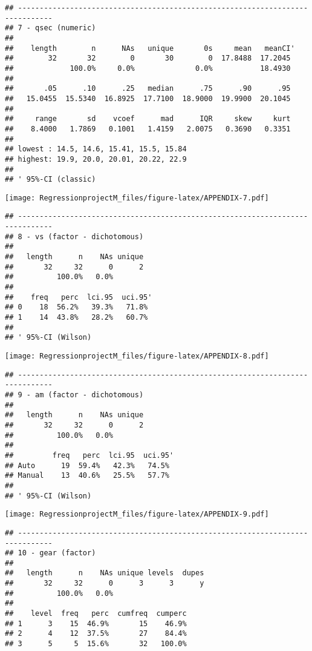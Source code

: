 \documentclass[
]{article}
\begin{document}
\begin{verbatim}
## ------------------------------------------------------------------------------ 
## 7 - qsec (numeric)
## 
##    length        n      NAs   unique       0s     mean   meanCI'
##        32       32        0       30        0  17.8488  17.2045
##             100.0%     0.0%              0.0%           18.4930
##                                                                
##       .05      .10      .25   median      .75      .90      .95
##   15.0455  15.5340  16.8925  17.7100  18.9000  19.9900  20.1045
##                                                                
##     range       sd    vcoef      mad      IQR     skew     kurt
##    8.4000   1.7869   0.1001   1.4159   2.0075   0.3690   0.3351
##                                                                
## lowest : 14.5, 14.6, 15.41, 15.5, 15.84
## highest: 19.9, 20.0, 20.01, 20.22, 22.9
## 
## ' 95%-CI (classic)
\end{verbatim}

\texttt{[image: RegressionprojectM\_files/figure-latex/APPENDIX-7.pdf]}

\begin{verbatim}
## ------------------------------------------------------------------------------ 
## 8 - vs (factor - dichotomous)
## 
##   length      n    NAs unique
##       32     32      0      2
##          100.0%   0.0%       
## 
##    freq   perc  lci.95  uci.95'
## 0    18  56.2%   39.3%   71.8%
## 1    14  43.8%   28.2%   60.7%
## 
## ' 95%-CI (Wilson)
\end{verbatim}

\texttt{[image: RegressionprojectM\_files/figure-latex/APPENDIX-8.pdf]}

\begin{verbatim}
## ------------------------------------------------------------------------------ 
## 9 - am (factor - dichotomous)
## 
##   length      n    NAs unique
##       32     32      0      2
##          100.0%   0.0%       
## 
##         freq   perc  lci.95  uci.95'
## Auto      19  59.4%   42.3%   74.5%
## Manual    13  40.6%   25.5%   57.7%
## 
## ' 95%-CI (Wilson)
\end{verbatim}

\texttt{[image: RegressionprojectM\_files/figure-latex/APPENDIX-9.pdf]}

\begin{verbatim}
## ------------------------------------------------------------------------------ 
## 10 - gear (factor)
## 
##   length      n    NAs unique levels  dupes
##       32     32      0      3      3      y
##          100.0%   0.0%                     
## 
##    level  freq   perc  cumfreq  cumperc
## 1      3    15  46.9%       15    46.9%
## 2      4    12  37.5%       27    84.4%
## 3      5     5  15.6%       32   100.0%
\end{verbatim}
\end{document}
